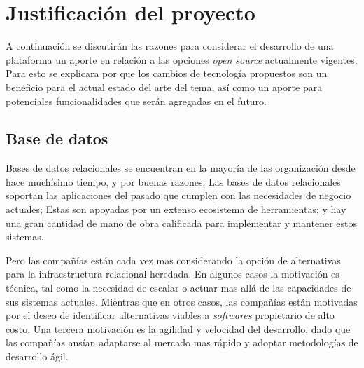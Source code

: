 
\chapter{Justificación del proyecto}\label{cap:justificacion_proyecto}


A continuación se discutirán las razones para considerar el desarrollo de una plataforma \textit{} un aporte en relación a las opciones \textit{open source} actualmente vigentes. Para esto se explicara por que los cambios de tecnología propuestos son un beneficio para el actual estado del arte del tema, así como un aporte para potenciales funcionalidades que serán agregadas en el futuro.


\section{Base de datos}

Bases de datos relacionales se encuentran en la mayoría de las organización desde hace muchísimo tiempo, y por buenas razones. Las bases de datos relacionales soportan las aplicaciones del pasado que cumplen con las necesidades de negocio actuales; Estas son apoyadas por un extenso ecosistema de herramientas; y hay una gran cantidad de mano de obra calificada para implementar y mantener estos sistemas.

Pero las compañías están cada vez mas considerando la opción de alternativas para la infraestructura relacional heredada. En algunos casos la motivación es técnica, tal como la necesidad de escalar o actuar mas allá de las capacidades de sus sistemas actuales. Mientras que en otros casos, las compañías están motivadas por el deseo de identificar alternativas viables a \textit{softwares} propietario de alto costo. Una tercera motivación es la agilidad y velocidad del desarrollo, dado que las compañías ansían adaptarse al mercado mas rápido y adoptar metodologías de desarrollo ágil.


